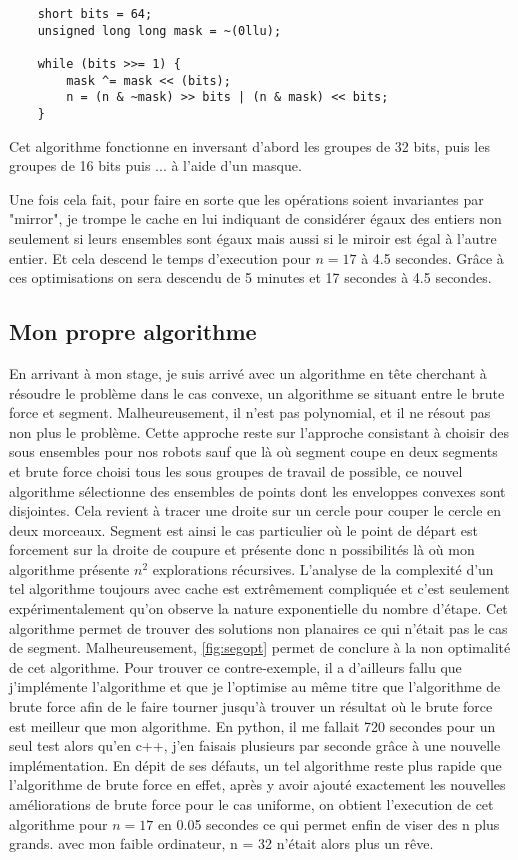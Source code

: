 \begin{verbatim}
	short bits = 64;
    unsigned long long mask = ~(0llu);

    while (bits >>= 1) {
        mask ^= mask << (bits);
        n = (n & ~mask) >> bits | (n & mask) << bits;
    }
\end{verbatim}

Cet algorithme fonctionne en inversant d'abord les groupes de 32 bits, puis les groupes de 16 bits puis ... à l'aide d'un masque.

Une fois cela fait, pour faire en sorte que les opérations soient invariantes par "mirror", je trompe le cache en lui indiquant de considérer égaux des entiers non seulement si leurs ensembles sont égaux mais aussi si le miroir est égal à l'autre entier. Et cela descend le temps d'execution pour $n = 17$ à 4.5 secondes.
Grâce à ces optimisations on sera descendu de 5 minutes et 17 secondes à 4.5 secondes.

\subsection{Mon propre algorithme}

En arrivant à mon stage, je suis arrivé avec un algorithme en tête cherchant à résoudre le problème dans le cas convexe, un algorithme se situant entre le brute force et segment. Malheureusement, il n'est pas polynomial, et il ne résout pas non plus le problème. Cette approche reste sur l'approche consistant à choisir des sous ensembles pour nos robots sauf que là où segment coupe en deux segments et brute force choisi tous les sous groupes de travail de possible, ce nouvel algorithme sélectionne des ensembles de points dont les enveloppes convexes sont disjointes. Cela revient à tracer une droite sur un cercle pour couper le cercle en deux morceaux. Segment est ainsi le cas particulier où le point de départ est forcement sur la droite de coupure et présente donc n possibilités là où mon algorithme présente $n^2$ explorations récursives. L'analyse de la complexité d'un tel algorithme toujours avec cache est extrêmement compliquée et c'est seulement expérimentalement qu'on observe la nature exponentielle du nombre d'étape. Cet algorithme permet de trouver des solutions non planaires ce qui n'était pas le cas de segment. Malheureusement, \ref{fig:segopt} permet de conclure à la non optimalité de cet algorithme. Pour trouver ce contre-exemple, il a d'ailleurs fallu que j'implémente l'algorithme et que je l'optimise au même titre que l'algorithme de brute force afin de le faire tourner jusqu'à trouver un résultat où le brute force est meilleur que mon algorithme. En python, il me fallait 720 secondes pour un seul test alors qu'en c++, j'en faisais plusieurs par seconde grâce à une nouvelle implémentation.
En dépit de ses défauts, un tel algorithme reste plus rapide que l'algorithme de brute force en effet, après y avoir ajouté exactement les nouvelles améliorations de brute force pour le cas uniforme, on obtient l'execution de cet algorithme pour $n = 17$ en 0.05 secondes ce qui permet enfin de viser des n plus grands. avec mon faible ordinateur, n = 32 n'était alors plus un rêve.

